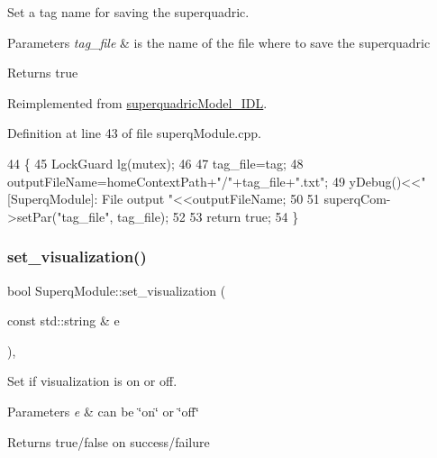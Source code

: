 Set a tag name for saving the superquadric. 


\begin{DoxyParams}{Parameters}
{\em tag\+\_\+file} & is the name of the file where to save the superquadric \\
\hline
\end{DoxyParams}
\begin{DoxyReturn}{Returns}
true 
\end{DoxyReturn}


Reimplemented from \mbox{\hyperlink{classsuperquadricModel__IDL_a781426bfc4862e87ef75a4bbbfa33275}{superquadric\+Model\+\_\+\+I\+DL}}.



Definition at line 43 of file superq\+Module.\+cpp.


\begin{DoxyCode}
44 \{
45     LockGuard lg(mutex);
46 
47     tag_file=tag;
48     outputFileName=homeContextPath+\textcolor{stringliteral}{"/"}+tag_file+\textcolor{stringliteral}{".txt"};
49     yDebug()<<\textcolor{stringliteral}{" [SuperqModule]: File output "}<<outputFileName;
50 
51     superqCom->setPar(\textcolor{stringliteral}{"tag\_file"}, tag_file);
52 
53     \textcolor{keywordflow}{return} \textcolor{keyword}{true};
54 \}
\end{DoxyCode}
\mbox{\label{classSuperqModule_ae4fc54ad89b3ee72ab5ea8c8b5065866}} 
\subsubsection{\texorpdfstring{set\+\_\+visualization()}{set\_visualization()}}
{\footnotesize\ttfamily bool Superq\+Module\+::set\+\_\+visualization (\begin{DoxyParamCaption}\item[{const std\+::string \&}]{e }\end{DoxyParamCaption})\hspace{0.3cm}{\ttfamily [protected]}, {\ttfamily [virtual]}}



Set if visualization is on or off. 


\begin{DoxyParams}{Parameters}
{\em e} & can be \char`\"{}on\char`\"{} or \char`\"{}off\char`\"{} \\
\hline
\end{DoxyParams}
\begin{DoxyReturn}{Returns}
true/false on success/failure 
\end{DoxyReturn}


